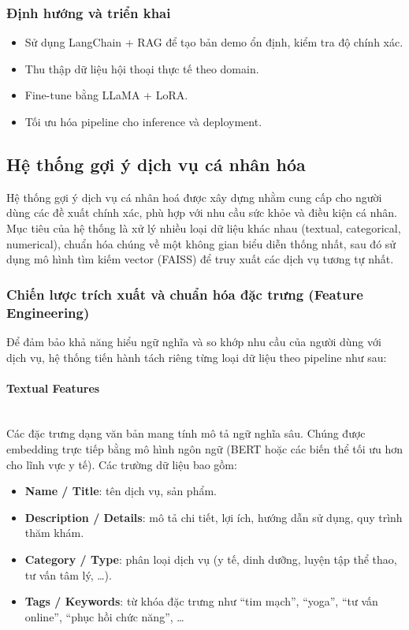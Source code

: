 


\subsubsection{Định hướng và triển khai}
\begin{itemize}
    \item Sử dụng LangChain + RAG để tạo bản demo ổn định, kiểm tra độ chính xác.  
    \item Thu thập dữ liệu hội thoại thực tế theo domain.  
    \item Fine-tune bằng LLaMA + LoRA.  
    \item Tối ưu hóa pipeline cho inference và deployment.  
\end{itemize}




\subsection{Hệ thống gợi ý dịch vụ cá nhân hóa}

Hệ thống gợi ý dịch vụ cá nhân hoá được xây dựng nhằm cung cấp cho người dùng các đề xuất chính xác, phù hợp với nhu cầu sức khỏe và điều kiện cá nhân. Mục tiêu của hệ thống là xử lý nhiều loại dữ liệu khác nhau (textual, categorical, numerical), chuẩn hóa chúng về một không gian biểu diễn thống nhất, sau đó sử dụng mô hình tìm kiếm vector (FAISS) để truy xuất các dịch vụ tương tự nhất.

\subsubsection{Chiến lược trích xuất và chuẩn hóa đặc trưng (Feature Engineering)}

Để đảm bảo khả năng hiểu ngữ nghĩa và so khớp nhu cầu của người dùng với dịch vụ, hệ thống tiến hành tách riêng từng loại dữ liệu theo pipeline như sau:

\paragraph{Textual Features} \\
Các đặc trưng dạng văn bản mang tính mô tả ngữ nghĩa sâu. Chúng được embedding trực tiếp bằng mô hình ngôn ngữ (BERT hoặc các biến thể tối ưu hơn cho lĩnh vực y tế). Các trường dữ liệu bao gồm: \\
\begin{itemize}
    \item \textbf{Name / Title}: tên dịch vụ, sản phẩm.
    \item \textbf{Description / Details}: mô tả chi tiết, lợi ích, hướng dẫn sử dụng, quy trình thăm khám.
    \item \textbf{Category / Type}: phân loại dịch vụ (y tế, dinh dưỡng, luyện tập thể thao, tư vấn tâm lý, \ldots).
    \item \textbf{Tags / Keywords}: từ khóa đặc trưng như ``tim mạch'', ``yoga'', ``tư vấn online'', ``phục hồi chức năng'', \ldots
\end{itemize}

